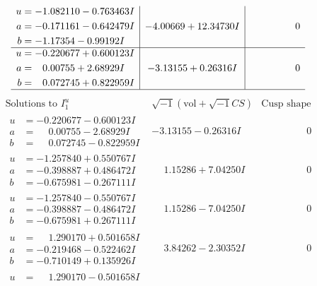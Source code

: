 \documentclass[1p]{elsarticle_modified}
\theoremstyle{definition}
\newcommand{\I}{\sqrt{-1}}
\begin{document}
$$\begin{array}{c|c|c}
\begin{aligned}
u &= -1.082110 - 0.763463 I \\
a &= -0.171161 - 0.642479 I \\
b &= -1.17354 - 0.99192 I\end{aligned}
 & -4.00669 + 12.34730 I & \phantom{-0.000000 } 0 \\ \hline\begin{aligned}
u &= -0.220677 + 0.600123 I \\
a &= \phantom{-}0.00755 + 2.68929 I \\
b &= \phantom{-}0.072745 + 0.822959 I\end{aligned}
 & -3.13155 + 0.26316 I & \phantom{-0.000000 } 0\\
 \hline 
 \end{array}$$\newpage$$\begin{array}{c|c|c}  
\text{Solutions to }I^u_{1}& \I (\text{vol} + \sqrt{-1}CS) & \text{Cusp shape}\\
 \hline 
\begin{aligned}
u &= -0.220677 - 0.600123 I \\
a &= \phantom{-}0.00755 - 2.68929 I \\
b &= \phantom{-}0.072745 - 0.822959 I\end{aligned}
 & -3.13155 - 0.26316 I & \phantom{-0.000000 } 0 \\ \hline\begin{aligned}
u &= -1.257840 + 0.550767 I \\
a &= -0.398887 + 0.486472 I \\
b &= -0.675981 - 0.267111 I\end{aligned}
 & \phantom{-}1.15286 + 7.04250 I & \phantom{-0.000000 } 0 \\ \hline\begin{aligned}
u &= -1.257840 - 0.550767 I \\
a &= -0.398887 - 0.486472 I \\
b &= -0.675981 + 0.267111 I\end{aligned}
 & \phantom{-}1.15286 - 7.04250 I & \phantom{-0.000000 } 0 \\ \hline\begin{aligned}
u &= \phantom{-}1.290170 + 0.501658 I \\
a &= -0.219468 - 0.522462 I \\
b &= -0.710149 + 0.135926 I\end{aligned}
 & \phantom{-}3.84262 - 2.30352 I & \phantom{-0.000000 } 0 \\ \hline\begin{aligned}
u &= \phantom{-}1.290170 - 0.501658 I \\

\end{aligned}
\end{array}$$
\end{document}
